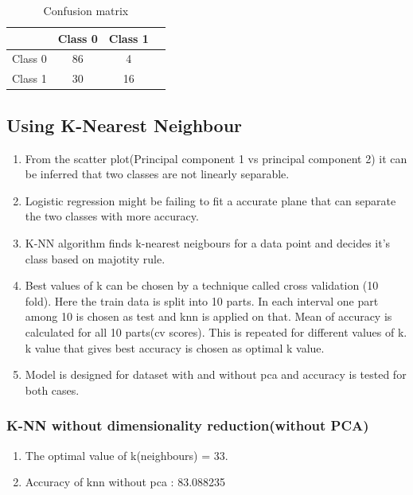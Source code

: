 \documentclass[12pt]{article}
\begin{document}
\begin{table}[h]
\begin{center}
\begin{tabular}{|c|c|c|c|}
\hline
 \textbf{} & {Class 0} & {Class 1}\\\hline
Class 0  & 86 & 4\\\hline
Class 1  & 30 & 16\\\hline
\end{tabular}
\end{center}
\caption{Confusion matrix}
\end{table}

\subsection{Using K-Nearest Neighbour}


\begin{enumerate}
\item From the scatter plot(Principal component 1 vs principal component 2) it can be inferred that two classes are not linearly separable.
\item Logistic regression might be failing to fit a accurate plane that can separate the two classes with more accuracy.
\item K-NN algorithm finds k-nearest neigbours for a data point and decides it's class based on majotity rule. 
\item Best values of k can be chosen by a technique called cross validation (10 fold). Here the train data is split into 10 parts. In each interval one part among 10 is chosen as test and knn is applied on that. Mean of accuracy is calculated for all 10 parts(cv scores). This is repeated for different values of k. k value that gives best accuracy is chosen as optimal k value.
\item Model is designed for dataset with and without pca and accuracy is tested for both cases.
\end{enumerate}


\subsubsection{K-NN without dimensionality reduction(without PCA)}

\begin{enumerate}
\item The optimal value of k(neighbours) = 33.
\item Accuracy of knn without pca : 83.088235

\end{enumerate}
\end{document}
